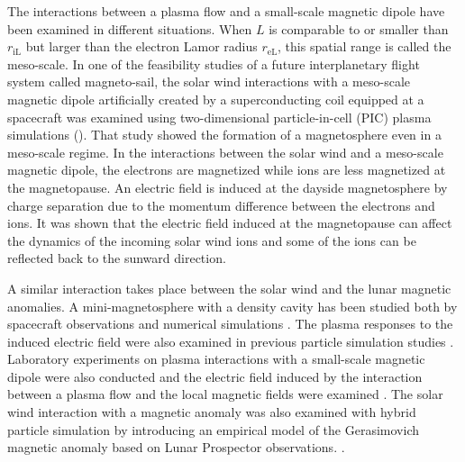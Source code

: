 \documentclass[draft,jgrga]{agutex2015}
\begin{document}
\begin{article}
The interactions between a plasma flow and a small-scale magnetic dipole 
have been examined in different situations.
When $L$ is comparable to or smaller than $r_\mathrm{iL}$
but larger than the electron Lamor radius $r_\mathrm{eL}$,
this spatial range is called the meso-scale.
In one of the feasibility studies of a future interplanetary flight system called magneto-sail,
the solar wind interactions with a meso-scale magnetic dipole artificially created by a
superconducting coil equipped at a spacecraft was examined using two-dimensional
particle-in-cell (PIC) plasma simulations (\cite{Moritaka2012}).
That study showed the formation of a magnetosphere even in a meso-scale regime.
In the interactions between the solar wind and a meso-scale magnetic dipole,
the electrons are magnetized while ions are less magnetized at the magnetopause.
An electric field is induced at the dayside magnetosphere by charge separation
due to the momentum difference between the electrons and ions.
It was shown that the electric field induced at the magnetopause
can affect the dynamics of the incoming solar wind ions and some of the ions can be reflected
back to the sunward direction.

A similar interaction takes place between the solar wind and the lunar magnetic anomalies.
A mini-magnetosphere with a density cavity has been studied both by
 spacecraft observations and numerical simulations
\citep[e.g.][]{Harnett2000,Harnett2003,Halekas2008b,Bamford2012}.
The plasma responses to the induced electric field were also examined
in  previous particle simulation studies
\citep[e.g.][]{Harnett2002,Kallio2012,Poppe2012a,Deca2014,Deca2015}.
Laboratory experiments on plasma interactions
with a small-scale magnetic dipole
were also conducted and the electric field 
induced by the interaction
between a plasma flow and the local magnetic fields were examined
\citep[e.g.][]{Howes2015,Jarvinen2014,Wang2013,Bamford2012}.
The solar wind interaction with a magnetic anomaly was also 
examined with hybrid particle simulation by introducing 
an empirical model of the Gerasimovich magnetic anomaly based 
on Lunar Prospector observations. 
\citep{Fatemi2015}.



\end{article}
\end{document}
